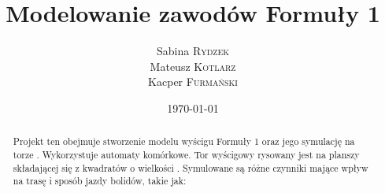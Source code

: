 \documentclass{article}
\title{Modelowanie zawodów Formuły 1} %
\author{Sabina \textsc{Rydzek} \\ Mateusz \textsc{Kotlarz} \\ Kacper \textsc{Furmański}} %
\date{\today} %
\begin{document}
\maketitle %


\begin{abstract}
Projekt ten obejmuje stworzenie modelu wyścigu Formuły 1 oraz jego symulację na torze . Wykorzystuje automaty komórkowe. Tor wyścigowy rysowany jest na planszy składającej się z kwadratów o wielkości . Symulowane są różne czynniki mające wpływ na trasę i sposób jazdy bolidów, takie jak: 
\end{abstract}






\end{document}
